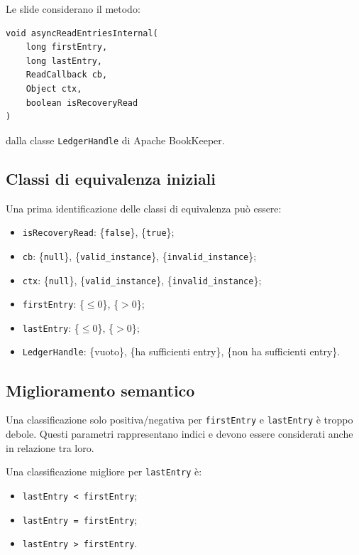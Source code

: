 Le slide considerano il metodo:

\begin{verbatim}
void asyncReadEntriesInternal(
    long firstEntry,
    long lastEntry,
    ReadCallback cb,
    Object ctx,
    boolean isRecoveryRead
)
\end{verbatim}

dalla classe \texttt{LedgerHandle} di Apache BookKeeper.

\subsection{Classi di equivalenza iniziali}

Una prima identificazione delle classi di equivalenza può essere:

\begin{itemize}
    \item \texttt{isRecoveryRead}: \{\texttt{false}\}, \{\texttt{true}\};
    \item \texttt{cb}: \{\texttt{null}\}, \{\texttt{valid\_instance}\}, \{\texttt{invalid\_instance}\};
    \item \texttt{ctx}: \{\texttt{null}\}, \{\texttt{valid\_instance}\}, \{\texttt{invalid\_instance}\};
    \item \texttt{firstEntry}: \{\(\leq 0\)\}, \{\(> 0\)\};
    \item \texttt{lastEntry}: \{\(\leq 0\)\}, \{\(> 0\)\};
    \item \texttt{LedgerHandle}: \{vuoto\}, \{ha sufficienti entry\}, \{non ha sufficienti entry\}.
\end{itemize}

\subsection{Miglioramento semantico}

Una classificazione solo positiva/negativa per \texttt{firstEntry} e \texttt{lastEntry} è troppo debole. Questi parametri rappresentano indici e devono essere considerati anche in relazione tra loro.

Una classificazione migliore per \texttt{lastEntry} è:

\begin{itemize}
    \item \texttt{lastEntry < firstEntry};
    \item \texttt{lastEntry = firstEntry};
    \item \texttt{lastEntry > firstEntry}.
\end{itemize}

